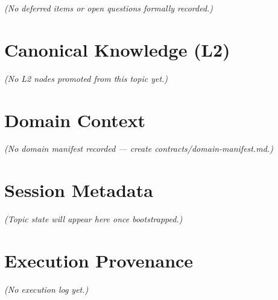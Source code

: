 \documentclass[11pt,a4paper]{article}
\numberwithin{equation}{section}
\begin{document}
\textit{(No deferred items or open questions formally recorded.)}


\section{Canonical Knowledge (L2)}

\textit{(No L2 nodes promoted from this topic yet.)}


\section{Domain Context}

\textit{(No domain manifest recorded — create contracts/domain-manifest.md.)}


\section{Session Metadata}

\textit{(Topic state will appear here once bootstrapped.)}


\section{Execution Provenance}

\textit{(No execution log yet.)}
\end{document}
